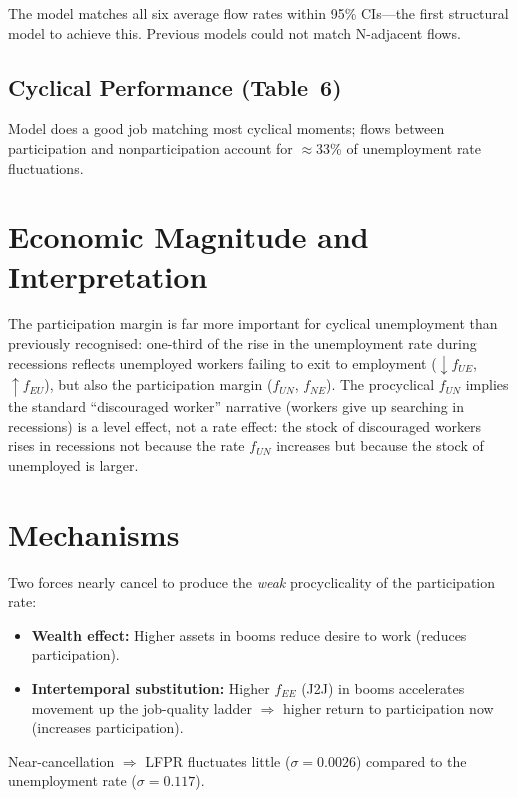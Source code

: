 The model matches all six average flow rates within 95\% CIs---the first
structural model to achieve this. Previous models could not match N-adjacent
flows.

\subsection*{Cyclical Performance (Table~6)}

Model does a good job matching most cyclical moments; flows between
participation and nonparticipation account for $\approx$33\% of unemployment
rate fluctuations.

\section{Economic Magnitude and Interpretation}

The participation margin is far more important for cyclical unemployment than
previously recognised: one-third of the rise in the unemployment rate during
recessions reflects unemployed workers failing to exit to employment
($\downarrow f_{UE}$, $\uparrow f_{EU}$), but also the participation margin
($f_{UN}$, $f_{NE}$). The procyclical $f_{UN}$ implies the standard
``discouraged worker'' narrative (workers give up searching in recessions) is
a level effect, not a rate effect: the stock of discouraged workers rises in
recessions not because the rate $f_{UN}$ increases but because the stock of
unemployed is larger.

\section{Mechanisms}

Two forces nearly cancel to produce the \emph{weak} procyclicality of the
participation rate:
\begin{itemize}
  \item \textbf{Wealth effect:} Higher assets in booms reduce desire to work
    (reduces participation).
  \item \textbf{Intertemporal substitution:} Higher $f_{EE}$ (J2J) in booms
    accelerates movement up the job-quality ladder $\Rightarrow$ higher
    return to participation now (increases participation).
\end{itemize}
Near-cancellation $\Rightarrow$ LFPR fluctuates little ($\sigma=0.0026$)
compared to the unemployment rate ($\sigma=0.117$).

